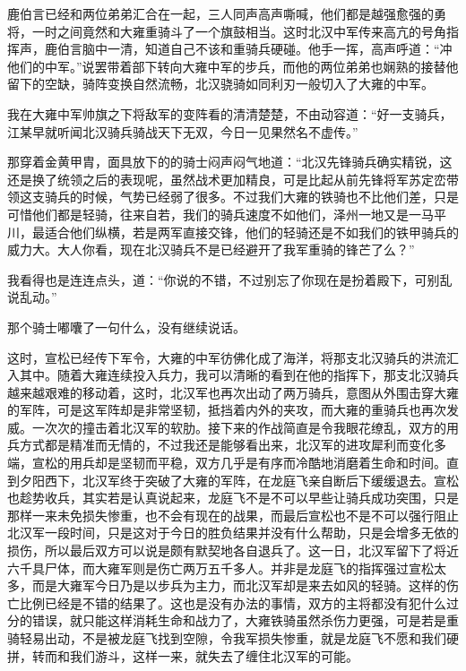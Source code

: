 鹿伯言已经和两位弟弟汇合在一起，三人同声高声嘶喊，他们都是越强愈强的勇将，一时之间竟然和大雍重骑斗了一个旗鼓相当。这时北汉中军传来高亢的号角指挥声，鹿伯言脑中一清，知道自己不该和重骑兵硬碰。他手一挥，高声呼道：“冲他们的中军。”说罢带着部下转向大雍中军的步兵，而他的两位弟弟也娴熟的接替他留下的空缺，骑阵变换自然流畅，北汉骁骑如同利刃一般切入了大雍的中军。

我在大雍中军帅旗之下将敌军的变阵看的清清楚楚，不由动容道：“好一支骑兵，江某早就听闻北汉骑兵骑战天下无双，今日一见果然名不虚传。”

那穿着金黄甲胄，面具放下的的骑士闷声闷气地道：“北汉先锋骑兵确实精锐，这还是换了统领之后的表现呢，虽然战术更加精良，可是比起从前先锋将军苏定峦带领这支骑兵的时候，气势已经弱了很多。不过我们大雍的铁骑也不比他们差，只是可惜他们都是轻骑，往来自若，我们的骑兵速度不如他们，泽州一地又是一马平川，最适合他们纵横，若是两军直接交锋，他们的轻骑还是不如我们的铁甲骑兵的威力大。大人你看，现在北汉骑兵不是已经避开了我军重骑的锋芒了么？”

我看得也是连连点头，道：“你说的不错，不过别忘了你现在是扮着殿下，可别乱说乱动。”

那个骑士嘟囔了一句什么，没有继续说话。

这时，宣松已经传下军令，大雍的中军彷佛化成了海洋，将那支北汉骑兵的洪流汇入其中。随着大雍连续投入兵力，我可以清晰的看到在他的指挥下，那支北汉骑兵越来越艰难的移动着，这时，北汉军也再次出动了两万骑兵，意图从外围击穿大雍的军阵，可是这军阵却是非常坚韧，抵挡着内外的夹攻，而大雍的重骑兵也再次发威。一次次的撞击着北汉军的软肋。接下来的作战简直是令我眼花缭乱，双方的用兵方式都是精准而无情的，不过我还是能够看出来，北汉军的进攻犀利而变化多端，宣松的用兵却是坚韧而平稳，双方几乎是有序而冷酷地消磨着生命和时间。直到夕阳西下，北汉军终于突破了大雍的军阵，在龙庭飞亲自断后下缓缓退去。宣松也趁势收兵，其实若是认真说起来，龙庭飞不是不可以早些让骑兵成功突围，只是那样一来未免损失惨重，也不会有现在的战果，而最后宣松也不是不可以强行阻止北汉军一段时间，只是这对于今日的胜负结果并没有什么帮助，只是会增多无依的损伤，所以最后双方可以说是颇有默契地各自退兵了。这一日，北汉军留下了将近六千具尸体，而大雍军则是伤亡两万五千多人。并非是龙庭飞的指挥强过宣松太多，而是大雍军今日乃是以步兵为主力，而北汉军却是来去如风的轻骑。这样的伤亡比例已经是不错的结果了。这也是没有办法的事情，双方的主将都没有犯什么过分的错误，就只能这样消耗生命和战力了，大雍铁骑虽然杀伤力更强，可是若是重骑轻易出动，不是被龙庭飞找到空隙，令我军损失惨重，就是龙庭飞不愿和我们硬拼，转而和我们游斗，这样一来，就失去了缠住北汉军的可能。

